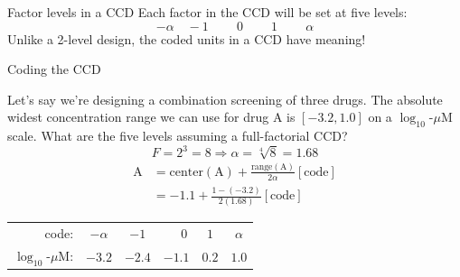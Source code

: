 \documentclass[10pt]{beamer}\usepackage[]{graphicx}\usepackage[]{color}
\begin{document}
\begin{frame}{Factor levels in a CCD}
Each factor in the CCD will be set at five levels:
\[ -\alpha\quad-1\quad\phantom{-}0\quad\phantom{-}1\quad\phantom{-}\alpha \]
\pause
Unlike a 2-level design, the coded units in a CCD have meaning!
\end{frame}

\begin{frame}{Coding the CCD}

Let's say we're designing a combination screening of three drugs. The absolute widest concentration range we can use for drug A is $[-3.2, 1.0]$ on a $\log_{10}$-$\mu$M scale. What are the five levels assuming a full-factorial CCD?
\pause
\[ F = 2^3 = 8 \Rightarrow \alpha = \sqrt[4]{8} = 1.68 \]
\pause
\begin{align*}
\text{A} &= \text{center}(\text{A}) + \frac{\text{range}(\text{A})}{2\alpha}[\text{code}] \\
  &= -1.1 + \frac{1 - (-3.2)}{2(1.68)}[\text{code}]
\end{align*}

\pause
\begin{center}
\begin{tabular}{rccccc}
  code: & $-\alpha$ & $-1$ & $\phantom{-}0$ & $1$ & $\alpha$ \\
  $\log_{10}$-$\mu$M: & $-3.2$ & $-2.4$ & $-1.1$ & $0.2$ & $1.0$
\end{tabular}
\end{center}

\end{frame}
\end{document}
